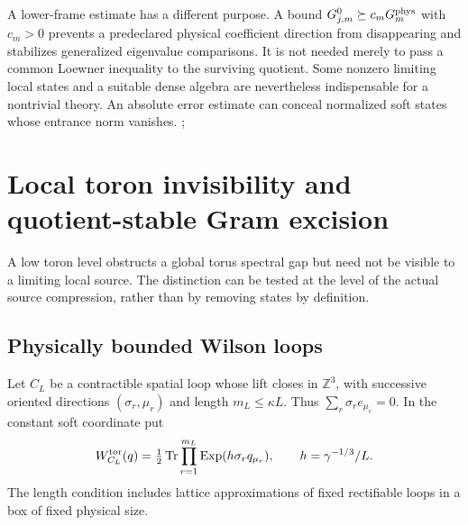\documentclass[11pt,oneside,openany]{book}
\theoremstyle{definition}
\theoremstyle{remark}
\newcommand{\src}[2]{\cite[#2]{#1}}
\begin{document}
A lower-frame estimate has a different purpose. A bound $G_{j,m}^0\succeq c_mG_m^{\rm phys}$ with $c_m>0$ prevents a predeclared physical coefficient direction from disappearing and stabilizes generalized eigenvalue comparisons. It is not needed merely to pass a common Loewner inequality to the surviving quotient. Some nonzero limiting local states and a suitable dense algebra are nevertheless indispensable for a nontrivial theory. An absolute error estimate can conceal normalized soft states whose entrance norm vanishes. \src{F1}{V1}; \cite{GT}

\section{Local toron invisibility and quotient-stable Gram excision}
\label{sec:local-toron-Grams}
A low toron level obstructs a global torus spectral gap but need not
be visible to a limiting local source. The distinction can be tested
at the level of the actual source compression, rather than by
removing states by definition.

\subsection{Physically bounded Wilson loops}
Let $C_L$ be a contractible spatial loop whose lift closes in
$\mathbb Z^3$, with successive oriented directions
$(\sigma_r,\mu_r)$ and length $m_L\le\kappa L$. Thus
$\sum_r\sigma_r e_{\mu_r}=0$. In the constant soft coordinate put
\[
 W^{\rm tor}_{C_L}(q)=\tfrac12\operatorname{Tr}
       \prod_{r=1}^{m_L}\operatorname{Exp}(h\sigma_rq_{\mu_r}),
 \qquad h=\gamma^{-1/3}/L.
\]
The length condition includes lattice approximations of fixed
rectifiable loops in a box of fixed physical size.
\end{document}

